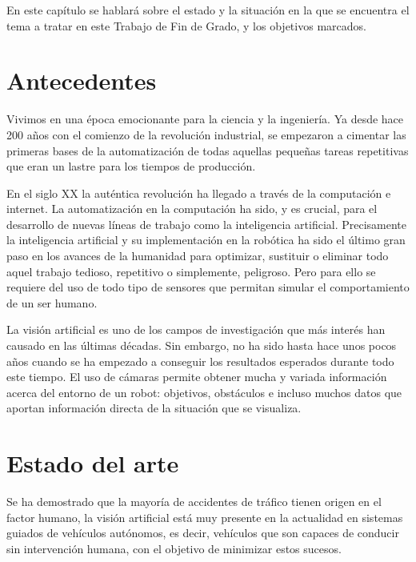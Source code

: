 

En este capítulo se hablará sobre el estado y la situación en la que se
encuentra el tema a tratar en este Trabajo de Fin de Grado, y los objetivos
marcados.


\section{Antecedentes}
\label{1:sec:1}

Vivimos en una época emocionante para la ciencia y la ingeniería. Ya desde hace
200 años con el comienzo de la revolución industrial, se empezaron a cimentar
las primeras bases de la automatización de todas aquellas pequeñas tareas
repetitivas que eran un lastre para los tiempos de producción.

En el siglo XX la auténtica revolución ha llegado a través de la computación e
internet. La automatización en la computación ha sido, y es crucial, para el
desarrollo de nuevas líneas de trabajo como la inteligencia artificial.
Precisamente la inteligencia artificial y su implementación en la robótica ha
sido el último gran paso en los avances de la humanidad para optimizar,
sustituir o eliminar todo aquel trabajo tedioso, repetitivo o simplemente,
peligroso. Pero para ello se requiere del uso de todo tipo de sensores que
permitan simular el comportamiento de un ser humano.

La visión artificial es uno de los campos de investigación que más interés han
causado en las últimas décadas. Sin embargo, no ha sido hasta hace unos pocos
años cuando se ha empezado a conseguir los resultados esperados durante todo
este tiempo. El uso de cámaras permite obtener mucha y variada información
acerca del entorno de un robot: objetivos, obstáculos e incluso muchos datos que
aportan información directa de la situación que se visualiza.


\section{Estado del arte}
\label{1:sec:2}
Se ha demostrado que la mayoría de accidentes de tráfico tienen origen en el
factor humano, la visión artificial está muy presente en la actualidad en
sistemas guiados de vehículos autónomos, es decir, vehículos que son capaces de
conducir sin intervención humana, con el objetivo de minimizar estos sucesos.

